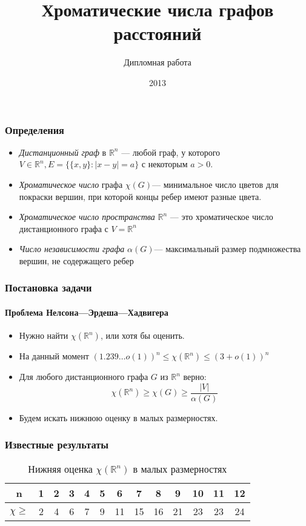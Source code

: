 \documentclass[svgnames,table]{beamer}
\title %
{Хроматические числа графов расстояний}
\subtitle{Дипломная работа}
\institute[МФТИ] %
{
Московский физико-технический институт
}
\date[2013] %
{2013}
\newcommand\Rn{\chi(\mathbb R^n)}
\begin{document}
\frame{\titlepage}

\begin{frame}
    \frametitle{Определения}
    \begin{itemize}
    \item\emph{Дистанционный граф} в $\mathbb R^n$ --- любой граф,
    у которого $V \in \mathbb R^n, E=\{\{x,y\}: |x-y|=a\}$ с некоторым $a > 0$.

    \item\emph{Хроматическое число} графа $\chi(G)$---
    минимальное число цветов для покраски вершин,
    при которой концы ребер имеют разные цвета.

    \item\emph{Хроматическое число пространства} $\mathbb R^n$ ---
    это хроматическое число дистанционного графа с $V=\mathbb R^n$

    \item\emph{Число независимости графа} $\alpha(G)$---
    максимальный размер подмножества вершин, не содержащего ребер
    \end{itemize}
\end{frame}

\begin{frame}
\frametitle{Постановка задачи}
\framesubtitle{Проблема Нелсона—Эрдеша—Хадвигера}
    \begin{itemize}
    \item Нужно найти $\Rn$, или хотя бы оценить.
    \item На данный момент
        $(1.239\dots o(1))^n \leq \Rn \leq (3+ o(1))^n$
    \item Для любого дистанционного графа $G$ из $\mathbb R^n$ верно:
        $$\Rn \geq \chi(G) \geq \frac{|V|}{\alpha(G)}$$
    \item Будем искать нижнюю оценку в малых размерностях.
    \end{itemize}
\end{frame}

\begin{frame}
    \frametitle{Известные результаты}
    \begin{table}\centering
        \caption{Нижняя оценка $\Rn$ в малых размерностях}
    \begin{tabular}{|c|c|c|c|c|c|c|c|c|c|c|c|c|}
        \hline
        n &         1 & 2 & 3 & 4 & 5 & 6 &
        7 & 8 & 9 & 10 & 11 & 12 \\ \hline
        $\chi \geq$ & 2 & 4 & 6 & 7 & 9 & 11 &
         15 & 16 & 21 & 23 & 23 & 24 \\ \hline
    \end{tabular}
\end{table}
\end{frame}
\end{document}
